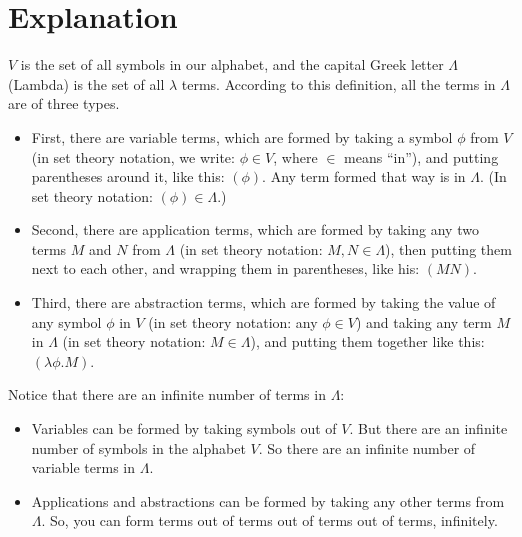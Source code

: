 \documentclass{book}
\numberwithin{equation}{chapter}
\begin{document}
\section{Explanation}

$V$ is the set of all symbols in our alphabet, and the capital Greek letter $\Lambda$ (Lambda) is the set of all $\lambda$ terms. According to this definition, all the terms in $\Lambda$ are of three types. 

\begin{itemize}

\item{First, there are variable terms, which are formed by taking a symbol $\phi$ from $V$ (in set theory notation, we write: $\phi \in V$, where $\in$ means ``in''), and putting parentheses around it, like this: $(\phi)$. Any term formed that way is in $\Lambda$. (In set theory notation: $(\phi) \in \Lambda$.)}

\item{Second, there are application terms, which are formed by taking any two terms $M$ and $N$ from $\Lambda$ (in set theory notation: $M, N \in \Lambda$), then putting them next to each other, and wrapping them in parentheses, like his: $(MN)$.}

\item{Third, there are abstraction terms, which are formed by taking the value of any symbol $\phi$ in $V$ (in set theory notation: any $\phi \in V$) and taking any term $M$ in $\Lambda$ (in set theory notation: $M \in \Lambda$), and putting them together like this: $(\lambda \phi.M)$.}

\end{itemize}

\noindent
Notice that there are an infinite number of terms in $\Lambda$: 

\begin{itemize}

\item{Variables can be formed by taking symbols out of $V$. But there are an infinite number of symbols in the alphabet $V$. So there are an infinite number of variable terms in $\Lambda$.}

\item{Applications and abstractions can be formed by taking any other terms from $\Lambda$. So, you can form terms out of terms out of terms out of terms, infinitely.}

\end{itemize}
\end{document}

